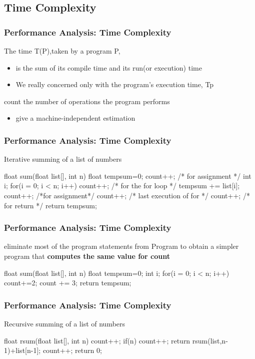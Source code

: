 \documentclass[newPxFont,sthlmFooter,nooffset]{beamer}
\begin{document}
\subsection{Time Complexity}
\begin{frame}[t]
  \frametitle{Performance Analysis: Time Complexity}
The time T(P),taken by a program P,
\begin{itemize}
\item is the sum of its compile time and its run(or execution) time
\item We really concerned only with the program’s execution time, Tp
\end{itemize}


count the number of operations the program performs
  \begin{itemize}
  \item give a machine-independent estimation
  \end{itemize}

\end{frame}


\begin{frame}[t, fragile]
  \frametitle{Performance Analysis: Time Complexity}
Iterative summing of a list of numbers
\begin{codedef}
float sum(float list[], int n) { 
   float tempsum=0;
   count++; /* for assignment */ 
   int i;
   for(i = 0; i < n; i++) { 
      count++; /* for the for loop */ 
      tempsum += list[i];
      count++; /*for assignment*/ 
   }
   count++; /* last execution of for */ 
   count++; /* for return */
   return tempsum;
}
\end{codedef}
\end{frame}


\begin{frame}[t, fragile]
  \frametitle{Performance Analysis: Time Complexity}
eliminate most of the program statements from Program to obtain a simpler program that \textbf{computes the same value for count}
\begin{codedef}
float sum(float list[], int n) {
   float tempsum=0;
   int i;
   for(i = 0; i < n; i++)
      count+=2;
   count += 3;
   return tempsum;
}
\end{codedef}
\end{frame}


\begin{frame}[t,fragile]
  \frametitle{Performance Analysis: Time Complexity}
Recursive summing of a list of numbers
\begin{codedef}
float rsum(float list[], int n) {
   count++;
   if(n) {
      count++;
      return rsum(list,n-1)+list[n-1]; 
   }
   count++;
   return 0; 
}
\end{codedef}
\end{frame}
\end{document}
